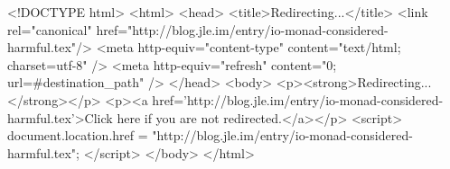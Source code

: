 <!DOCTYPE html>
<html>
<head>
<title>Redirecting...</title>
<link rel="canonical" href="http://blog.jle.im/entry/io-monad-considered-harmful.tex"/>
<meta http-equiv="content-type" content="text/html; charset=utf-8" />
<meta http-equiv="refresh" content="0; url=#{destination_path}" />
</head>
<body>
  <p><strong>Redirecting...</strong></p>
  <p><a href='http://blog.jle.im/entry/io-monad-considered-harmful.tex'>Click here if you are not redirected.</a></p>
  <script>
    document.location.href = "http://blog.jle.im/entry/io-monad-considered-harmful.tex";
  </script>
</body>
</html>
